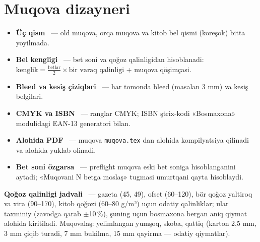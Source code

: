 \section{Muqova dizayneri}\label{sec:sd-muqova}
\begin{itemize}
\item \textbf{Üç qism} \beta\ --- old muqova, orqa muqova va kitob bel qismi (koreşok) bitta yoyilmada.
\item \textbf{Bel kengligi} \beta\ --- bet soni va qoğoz qalinligidan hisoblanadi: \(\text{kenglik} = \frac{\text{betlar}}{2} \times \text{bir varaq qalinligi}\) + muqova qöşimçasi.
\item \textbf{Bleed va kesiş çiziqlari} \beta\ --- har tomonda bleed (masalan 3 mm) va kesiş belgilari.
\item \textbf{CMYK va ISBN} \beta\ --- ranglar CMYK; ISBN ştrix-kodi «Bosmaxona» modulidagi EAN-13 generatori bilan.
\item \textbf{Alohida PDF} \beta\ --- muqova \texttt{muqova.tex} dan alohida kompilyatsiya qilinadi va alohida yuklab olinadi.
\item \textbf{Bet soni özgarsa} \beta\ --- preflight muqova eski bet soniga hisoblanganini aytadi; «Muqovani N betga moslaş» tugmasi umurtqani qayta hisoblaydi.
\end{itemize}

\textbf{Qoğoz qalinligi jadvali} \beta\ --- gazeta (45, 49), ofset (60--120), bör qoğoz yaltiroq va xira (90--170), kitob qoğozi (60--80 g/m²) uçun odatiy qalinliklar; ular taxminiy (zavodga qarab $\pm$10\,\%), şuning uçun bosmaxona bergan aniq qiymat alohida kiritiladi. Muqovalaş: yelimlangan yumşoq, skoba, qattiq (karton 2,5 mm, 3 mm çiqib turadi, 7 mm bukilma, 15 mm qayirma --- odatiy qiymatlar). 


